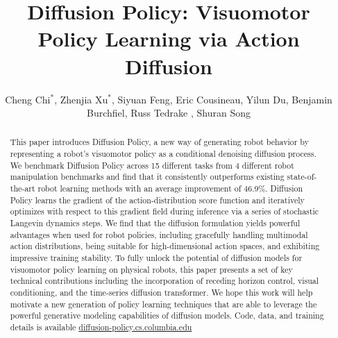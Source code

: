 \documentclass[Afour,sageh,times]{sagej}
\begin{document}

\title{Diffusion Policy: Visuomotor Policy Learning via Action Diffusion}

\author{Cheng Chi$^{*}$, Zhenjia Xu$^{*}$, Siyuan Feng, Eric Cousineau, Yilun Du,  Benjamin Burchfiel, Russ Tedrake , Shuran Song}




\begin{abstract} This paper introduces Diffusion Policy, a new way of generating robot behavior by representing a robot's visuomotor policy as a conditional denoising diffusion process. We benchmark Diffusion Policy across 15 different tasks from 4 different robot manipulation benchmarks and find that it consistently outperforms existing state-of-the-art robot learning methods with an average improvement of 46.9\%.
Diffusion Policy learns the gradient of the action-distribution score function and iteratively optimizes with respect to this gradient field during inference via a series of stochastic Langevin dynamics steps.
We find that the diffusion formulation yields powerful advantages when used for robot policies, including gracefully handling multimodal action distributions, being suitable for high-dimensional action spaces, and exhibiting impressive training stability.
To fully unlock the potential of diffusion models for visuomotor policy learning on physical robots, this paper presents a set of key technical contributions including the incorporation of receding horizon control, visual conditioning, and the time-series diffusion transformer.
We hope this work will help motivate a new generation of policy learning techniques that are able to leverage the powerful generative modeling capabilities of diffusion models. Code, data, and training details is available \url{diffusion-policy.cs.columbia.edu}
\end{abstract}
\end{document}
